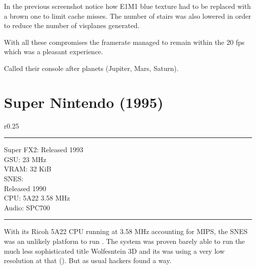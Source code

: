 \par
{}
\par
In the previous screenshot notice how E1M1 blue texture had to be replaced with a brown one to limit cache misses. The number of stairs was also lowered in order to reduce the number of visplanes generated.\\
\par
{}
\par
With all these compromises the framerate managed to remain within the 20 fps which was a pleasant experience.

Called their console after planets (Jupiter, Mars, Saturn).\\





\section{Super Nintendo (1995)}

\begin{wrapfigure}[14]{r}{0.25\textwidth}{\centering {}}
\hrule 
\bigskip
   Super FX2:
   Released 1993\\
   GSU: 23 MHz\\
   VRAM: 32 KiB\\
   
   SNES:\\
   Released 1990\\
   CPU: 5A22 3.58 MHz\\
   Audio: SPC700\\
\hrule 
\end{wrapfigure}



With its Ricoh 5A22 CPU running at 3.58 MHz accounting for \fixme{} MIPS, the SNES was an unlikely platform to run \doom. The system was proven barely able to run the much less sophisticated title Wolfesntein 3D and its was using a very low resolution at that (\fixme{}). But as usual hackers found a way.\\
\par


